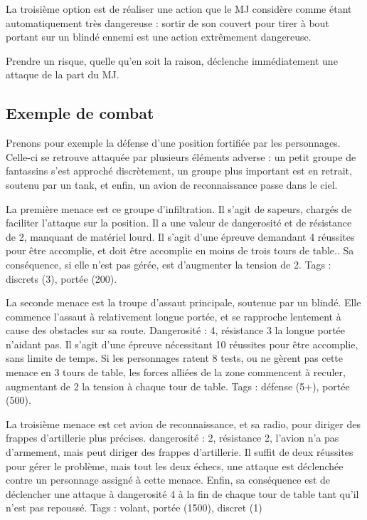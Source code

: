 \documentclass{report}
\begin{document}
\begin{multicols}{2}
La troisième option est de réaliser une action que le MJ considère comme étant automatiquement très dangereuse : sortir de son couvert pour tirer à bout portant sur un blindé ennemi est une action extrêmement dangereuse.

Prendre un risque, quelle qu'en soit la raison, déclenche immédiatement une attaque de la part du MJ.

\subsection{Exemple de combat}
Prenons pour exemple la défense d'une position fortifiée par les personnages. Celle-ci se retrouve attaquée par plusieurs éléments adverse : un petit groupe de fantassins s'est approché discrètement, un groupe plus important est en retrait, soutenu par un tank, et enfin, un avion de reconnaissance passe dans le ciel.

La première menace est ce groupe d'infiltration. Il s'agit de sapeurs, chargés de faciliter l'attaque sur la position. Il a une valeur de dangerosité et de résistance de 2, manquant de matériel lourd. Il s'agit d'une épreuve demandant 4 réussites pour être accomplie, et doit être accomplie en moins de trois tours de table.. Sa conséquence, si elle n'est pas gérée, est d'augmenter la tension de 2. Tags : discrets (3), portée (200).

La seconde menace est la troupe d'assaut principale, soutenue par un blindé. Elle commence l'assaut à relativement longue portée, et se rapproche lentement à cause des obstacles sur sa route. Dangerosité : 4, résistance 3 la longue portée n'aidant pas. Il s'agit d'une épreuve nécessitant 10 réussites pour être accomplie, sans limite de temps. Si les personnages ratent 8 tests, ou ne gèrent pas cette menace en 3 tours de table, les forces alliées de la zone commencent à reculer, augmentant de 2 la tension à chaque tour de table. Tags : défense (5+), portée (500).

La troisième menace est cet avion de reconnaissance, et sa radio, pour diriger des frappes d'artillerie plus précises. dangerosité : 2, résistance 2, l'avion n'a pas d'armement, mais peut diriger des frappes d'artillerie. Il suffit de deux réussites pour gérer le problème, mais tout les deux échecs, une attaque est déclenchée contre un personnage assigné à cette menace. Enfin, sa conséquence est de déclencher une attaque à dangerosité 4 à la fin de chaque tour de table tant qu'il n'est pas repoussé. Tags : volant, portée (1500), discret (1)

\end{multicols}
\end{document}
